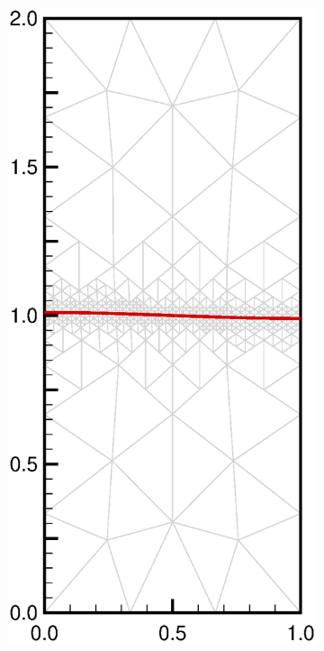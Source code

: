 \documentclass[11pt,a4paper,twoside]{article}
\begin{document}
	\begin{figure}[ht!]
		\begin{center}
			\begin{subfigure}[]{0.25\textwidth}
				\includegraphics[width=\textwidth]{StandingWave_N3_a01_full.eps}

\end{subfigure}
\end{center}
\end{figure}
\end{document}
